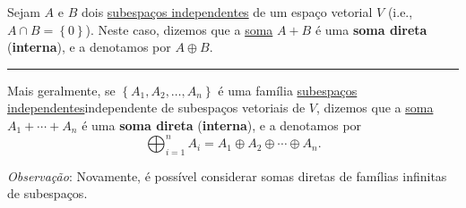 \begin{definition}
	Sejam $A$ e $B$ dois \href{http://mtm.ufsc.br/~cordeiro/ensino/mtm3112.algebra.linear/03.somas/con_subesp_indep_moodle.html}{subespaços independentes} de um espaço vetorial $V$ (i.e., $A\cap B=\left\{0\right\}$). Neste caso, dizemos que a \href{http://mtm.ufsc.br/~cordeiro/ensino/mtm3112.algebra.linear/03.somas/con_soma_de_subesp_moodle.html}{soma} $A+B$ é uma \textbf{soma direta} (\textbf{interna}), e a denotamos por $A\oplus B$.
	
	\hrule
	
	Mais geralmente, se $\left\{A_1,A_2,\ldots,A_n\right\}$ é uma família \href{http://mtm.ufsc.br/~cordeiro/ensino/mtm3112.algebra.linear/03.somas/con_subesp_indep_moodle.html}{subespaços independentes}{independente} de subespaços vetoriais de $V$, dizemos que a \href{http://mtm.ufsc.br/~cordeiro/ensino/mtm3112.algebra.linear/03.somas/con_soma_de_subesp_moodle.html}{soma} $A_1+\cdots+A_n$ é uma \textbf{soma direta} (\textbf{interna}), e a denotamos por
	\[\bigoplus_{i=1}^n A_i=A_1\oplus A_2\oplus\cdots\oplus A_n.\]
\end{definition}

\emph{Observação}: Novamente, é possível considerar somas diretas de famílias infinitas de subespaços.